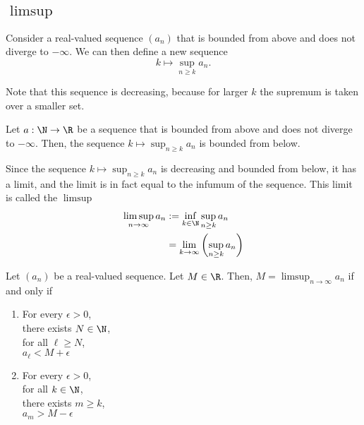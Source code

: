 \subsection{\texorpdfstring{$\limsup$}{limsup}}
Consider a real-valued sequence $(a_n)$ that is bounded from above and does not diverge to $-\infty$. We can then define a new sequence
$$k \mapsto \sup_{n \ge k} a_n.$$

Note that this sequence is decreasing, because for larger $k$ the supremum is taken over a smaller set. 
\begin{lemma}
    Let $a: \N \to \R$ be a sequence that is bounded from above and does not diverge to $-\infty$. Then, the sequence $k \mapsto \sup_{n \ge k}a_n$ is bounded
    from below.
\end{lemma}

Since the sequence $k \mapsto \sup_{n \ge k}a_n$ is decreasing and bounded from below, it has a limit, and the limit is in fact equal to the infumum of the sequence. This limit is called the $\limsup$
\begin{align*}
    \limsup_{n\to\infty}a_n &:= \inf_{k\in\N}\sup_{n \ge k}a_n \\
                            &=\lim_{k\to\infty}\left(\sup_{n\ge k}a_n\right)
\end{align*}

\begin{proposition}
    Let $(a_n)$ be a real-valued sequence. Let $M \in \R$. Then, $M = \limsup_{n\to\infty}a_n$ if and only if
    \begin{enumerate}[label=\roman*.]
        \item 
            \begin{center}
                \parbox{\linewidth}{%
                    \linewidth
                    For every $\epsilon > 0$, \\
                    \hspace*{1em} there exists $N \in \N$, \\
                    \hspace*{2em} for all $\ell \ge N$, \\
                    \hspace*{3em} $a_\ell < M + \epsilon$
                }
            \end{center}
        \item 
            \begin{center}
                \parbox{\linewidth}{
                    \linewidth
                    For every $\epsilon > 0$, \\
                    \hspace*{1em} for all $k \in \N$, \\
                    \hspace*{2em} there exists $m \ge k$, \\
                    \hspace*{3em} $a_m > M - \epsilon$ \\
                }
            \end{center}
    \end{enumerate}
\end{proposition}


